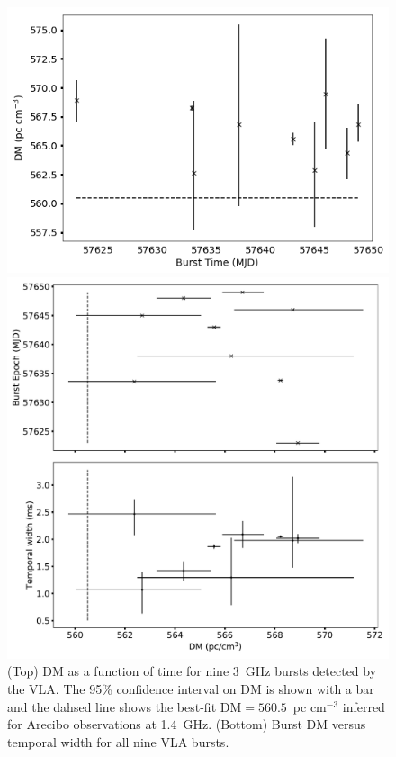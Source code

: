 \documentclass[twocolumn]{aastex61}
\begin{document}
\begin{figure}[htb]
\begin{center}
\includegraphics[width=\columnwidth]{dmmodel}

\includegraphics[width=\columnwidth]{burst_dmdt}

\caption{(Top) DM as a function of time for nine 3~GHz bursts detected by the VLA. The 95\% confidence interval on DM is shown with a bar and the dahsed line shows the best-fit DM$=560.5$\ pc cm$^{-3}$ inferred for Arecibo observations at 1.4~GHz. (Bottom) Burst DM versus temporal width for all nine VLA bursts.
\label{fig:dmmodel}}
\end{center}
\end{figure}
\end{document}

